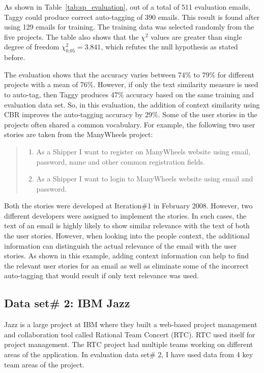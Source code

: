 As shown in Table~\ref{tab:sp_evaluation}, out of a total of 511 evaluation emails, Taggy could produce correct auto-tagging of 390 emails. This result is found after using 129 emails for training. The training data was selected randomly from the five projects. The table also shows that the $\chi^{2}$ values are greater than single degree of freedom $\chi^{2}_{0.05} = 3.841$, which refutes the null hypothesis as stated before.

The evaluation shows that the accuracy varies between 74\% to 79\% for different projects with a mean of 76\%. However, if only the text similarity measure is used to auto-tag, then Taggy produces 47\% accuracy based on the same training and evaluation data set. So, in this evaluation, the addition of context similarity using CBR improves the auto-tagging accuracy by 29\%. Some of the user stories in the projects often shared a common vocabulary. For example, the following two user stories are taken from the ManyWheels project:

\begin{quote}
	\begin{enumerate}
		\item As a Shipper I want to register on ManyWheels website using email, password, name and other common registration fields.
		\item As a Shipper I want to login to ManyWheels website using email and password.
	\end{enumerate}
\end{quote}

Both the stories were developed at Iteration\#1 in February 2008. However, two different developers were assigned to implement the stories. In such cases, the text of an email is highly likely to show similar relevance with the text of both the user stories. However, when looking into the people context, the additional information can distinguish the actual relevance of the email with the user stories. As shown in this example, adding context information can help to find the relevant user stories for an email as well as eliminate some of the incorrect auto-tagging that would result if only text relevance was used.

\subsection{Data set\# 2: IBM Jazz}
Jazz is a large project at IBM where they built a web-based project management and collaboration tool called Rational Team Concert (RTC). RTC used itself for project management. The RTC project had multiple teams working on different areas of the application. In evaluation data set\# 2, I have used data from 4 key team areas of the project.

